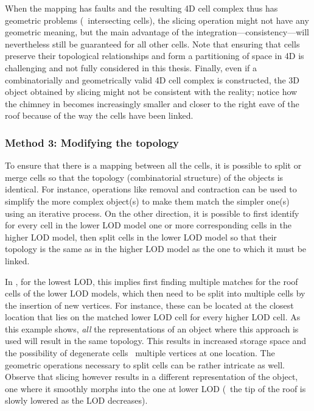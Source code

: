 When the mapping has faults and the resulting 4D cell complex thus has geometric problems (\eg\ intersecting cells), the slicing operation might not have any geometric meaning, but the main advantage of the integration---consistency---will nevertheless still be guaranteed for all other cells.
Note that ensuring that cells preserve their topological relationships and form a partitioning of space in 4D is challenging and not fully considered in this thesis.
Finally, even if a combinatorially and geometrically valid 4D cell complex is constructed, the 3D object obtained by slicing might not be consistent with the reality; notice how the chimney in  becomes increasingly smaller and closer to the right eave of the roof because of the way the cells have been linked.


\subsubsection{Method 3: Modifying the topology}
\label{sss:method3}

To ensure that there is a mapping between all the cells, it is possible to split or merge cells so that the topology (combinatorial structure) of the objects is identical.
For instance, operations like removal and contraction \citep{Damiand03} can be used to simplify the more complex object(s) to make them match the simpler one(s) using an iterative process.
On the other direction, it is possible to first identify for every cell in the lower LOD model one or more corresponding cells in the higher LOD model, then split cells in the lower LOD model so that their topology is the same as in the higher LOD model as the one to which it must be linked.

In , for the lowest LOD, this implies first finding multiple matches for the roof cells of the lower LOD models, which then need to be split into multiple cells by the insertion of new vertices.
For instance, these can be located at the closest location that lies on the matched lower LOD cell for every higher LOD cell.
As this example shows, \emph{all} the representations of an object where this approach is used will result in the same topology.
This results in increased storage space and the possibility of degenerate cells \eg\ multiple vertices at one location.
The geometric operations necessary to split cells can be rather intricate as well.
Observe that slicing however results in a different representation of the object, one where it smoothly morphs into the one at lower LOD (\eg\ the tip of the roof is slowly lowered as the LOD decreases).


